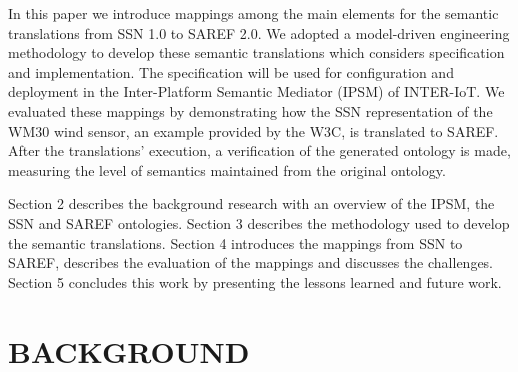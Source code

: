 \documentclass{sig-alternate-05-2015}
\begin{document}
In this paper we introduce mappings among the main elements for the semantic translations from SSN 1.0 to SAREF 2.0. We adopted a model-driven engineering methodology to develop these semantic translations which considers specification and implementation. The specification will be used for configuration and deployment in the Inter-Platform Semantic Mediator (IPSM) of INTER-IoT. We evaluated these mappings by demonstrating how the SSN representation of the WM30 wind sensor, an example provided by the W3C, is translated to SAREF. After the translations' execution, a verification of the generated ontology is made, measuring the level of semantics maintained from the original ontology. 

Section 2 describes the background research with an overview of the IPSM, the SSN and SAREF ontologies. Section 3 describes the methodology used to develop the semantic translations. Section 4 introduces the mappings from SSN to SAREF, describes the evaluation of the mappings and discusses the challenges. Section 5 concludes this work by presenting the lessons learned and future work. 


\section{BACKGROUND}
\end{document}
